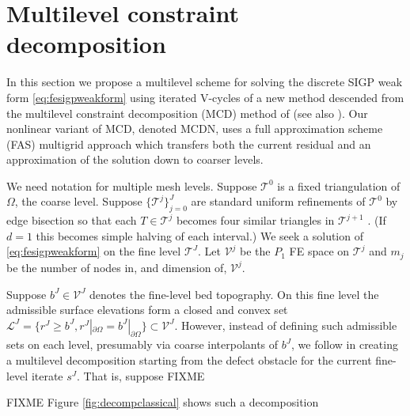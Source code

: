 \documentclass[letterpaper,final,12pt,reqno]{amsart}
\theoremstyle{claim}
\numberwithin{equation}{section}
\numberwithin{figure}{section}
\numberwithin{table}{section}
\numberwithin{theorem}{section}
\begin{document}
\section{Multilevel constraint decomposition} \label{sec:mcdstokes}

In this section we propose a multilevel scheme for solving the discrete SIGP weak form \eqref{eq:fesigpweakform} using iterated V-cycles of a new method descended from the multilevel constraint decomposition (MCD) method of \cite{Tai2003} (see also \cite{GraeserKornhuber2009}).  Our nonlinear variant of MCD, denoted MCDN, uses a full approximation scheme (FAS) multigrid \cite{Trottenbergetal2001} approach which transfers both the current residual and an approximation of the solution down to coarser levels.

We need notation for multiple mesh levels.  Suppose $\mathcal{T}^0$ is a fixed triangulation of $\Omega$, the coarse level.  Suppose $\{\mathcal{T}^j\}_{j=0}^J$ are standard uniform refinements of $\mathcal{T}^0$ by edge bisection so that each $T \in \mathcal{T}^j$ becomes four similar triangles in $\mathcal{T}^{j+1}$ \cite{Braess2007}.  (If $d=1$ this becomes simple halving of each interval.)  We seek a solution of \eqref{eq:fesigpweakform} on the fine level $\mathcal{T}^J$.  Let $\mathcal{V}^j$ be the $P_1$ FE space on $\mathcal{T}^j$ and $m_j$ be the number of nodes in, and dimension of, $\mathcal{V}^j$.

Suppose $b^J \in \mathcal{V}^J$ denotes the fine-level bed topography.  On this fine level the admissible surface elevations form a closed and convex set $\mathcal{L}^J = \{r^J \ge b^J, r^J|_{\partial\Omega} = b^J|_{\partial\Omega}\} \subset \mathcal{V}^J$.  However, instead of defining such admissible sets on each level, presumably via coarse interpolants of $b^J$, we follow \cite{GraeserKornhuber2009} in creating a multilevel decomposition starting from the defect obstacle for the current fine-level iterate $s^J$.  That is, suppose FIXME

FIXME Figure \ref{fig:decompclassical} shows such a decomposition
\end{document}
